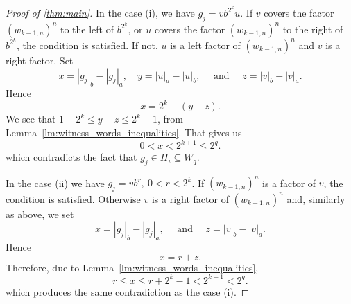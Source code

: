 \begin{proof}[Proof of \autoref*{thm:main}]
    In the case (i), we have $g_j = v b^{2^k} u$. If $v$ covers the factor ${(w_{k-1,n})}^{n}$ to the left of $b^{2^k}$, or $u$ covers the factor ${(w_{k-1,n})}^{n}$ to the right of $b^{2^k}$, the condition is satisfied. If not, $u$ is a left factor of ${(w_{k-1,n})}^{n}$ and $v$ is a right factor. Set
    \[
        x = |g_j|_b - |g_j|_a, \quad y = |u|_a - |u|_b, \quad \text{ and } \quad z = |v|_b - |v|_a.
    \]
    Hence
    \[
        x = 2^k - (y - z).
    \]
    We see that $1 - 2^k \leq y - z \leq 2^k - 1$, from Lemma~\ref*{lm:witness_words_inequalities}. That gives us
    \[
        0 < x < 2^{k+1} \leq 2^q.
    \]
    which contradicts the fact that $g_j \in H_i \subseteq W_q$.

    In the case (ii) we have $g_j = v b^{r}, \: 0 < r < 2^k$. If ${(w_{k-1,n})}^{n}$ is a factor of $v$, the condition is satisfied. Otherwise $v$ is a right factor of ${(w_{k-1,n})}^{n}$ and, similarly as above, we set
    \[
        x = |g_j|_b - |g_j|_a, \quad \text{ and } \quad z = |v|_b - |v|_a.
    \]
    Hence
    \[
        x = r + z.
    \]
    Therefore, due to Lemma~\ref*{lm:witness_words_inequalities},
    \[
        r \leq x \leq r + 2^k - 1 < 2^{k+1} < 2^q.
    \]
    which produces the same contradiction as the case (i).
\end{proof}